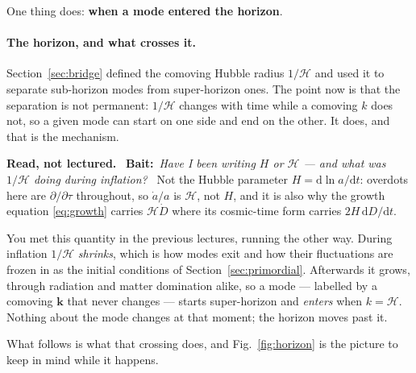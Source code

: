 \documentclass[a4paper,11pt]{article}
\newcommand{\vk}{\bm{k}}
\def\cH{\mathcal{H}}
\newcommand{\dd}{\mathrm{d}}
\numberwithin{equation}{section}
\newenvironment{reading}
  {\par\medskip\noindent\begingroup\small\color{black!58}%
   \textbf{Read, not lectured.}\ }
  {\endgroup\par\medskip}
\newcommand{\bait}[1]{\textbf{Bait:}\ \emph{#1}\ }
\begin{document}
One thing does: \textbf{when a mode entered the horizon}.

\paragraph{The horizon, and what crosses it.} Section~\ref{sec:bridge} defined
the comoving Hubble radius $1/\cH$ and used it to separate sub-horizon modes
from super-horizon ones. The point now is that the separation is not permanent:
$1/\cH$ changes with time while a comoving $k$ does not, so a given mode can
start on one side and end on the other. It does, and that is the mechanism.

\begin{reading}
\bait{Have I been writing $H$ or $\cH$ --- and what was $1/\cH$ doing during
inflation?}
Not the Hubble parameter $H = \dd\ln a/\dd t$: overdots here are
$\partial/\partial\tau$ throughout, so $\dot a/a$ is $\cH$, not $H$, and it is
also why the growth equation \eqref{eq:growth} carries $\cH\dot D$ where its
cosmic-time form carries $2H\,\dd D/\dd t$.

You met this quantity in the previous lectures, running the other way. During
inflation $1/\cH$ \emph{shrinks}, which is how modes exit and how their
fluctuations are frozen in as the initial conditions of
Section~\ref{sec:primordial}. Afterwards it grows, through radiation and matter
domination alike, so a mode --- labelled by a comoving $\vk$ that never changes
--- starts super-horizon and \emph{enters} when $k = \cH$. Nothing about the mode
changes at that moment; the horizon moves past it.
\end{reading}

What follows is what that
crossing does, and Fig.~\ref{fig:horizon} is the picture to keep in mind while
it happens.
\end{document}
